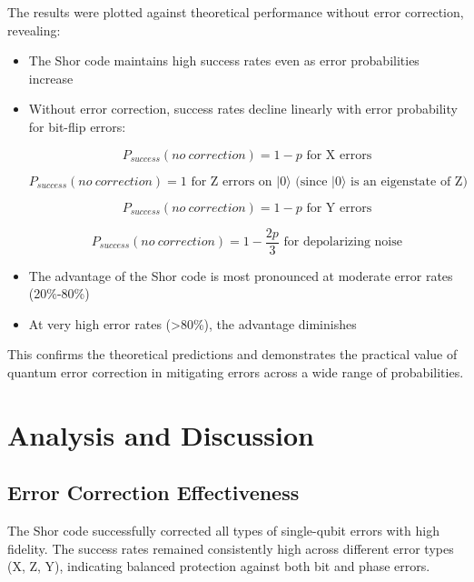 \documentclass[12pt,a4paper]{article}
\begin{document}
The results were plotted against theoretical performance without error correction, revealing:
\begin{itemize}
    \item The Shor code maintains high success rates even as error probabilities increase
    \item Without error correction, success rates decline linearly with error probability for bit-flip errors:
    
    \begin{equation}
        P_{success}(no~correction) = 1-p \text{ for X errors}
    \end{equation}
    
    \begin{equation}
        P_{success}(no~correction) = 1 \text{ for Z errors on } |0\rangle \text{ (since } |0\rangle \text{ is an eigenstate of Z)}
    \end{equation}
    
    \begin{equation}
        P_{success}(no~correction) = 1-p \text{ for Y errors}
    \end{equation}
    
    \begin{equation}
        P_{success}(no~correction) = 1-\frac{2p}{3} \text{ for depolarizing noise}
    \end{equation}

    \item The advantage of the Shor code is most pronounced at moderate error rates (20\%-80\%)
    \item At very high error rates (>80\%), the advantage diminishes
\end{itemize}

This confirms the theoretical predictions and demonstrates the practical value of quantum error correction in mitigating errors across a wide range of probabilities.

\section{Analysis and Discussion}

\subsection{Error Correction Effectiveness}

The Shor code successfully corrected all types of single-qubit errors with high fidelity. The success rates remained consistently high across different error types (X, Z, Y), indicating balanced protection against both bit and phase errors.
\end{document}

